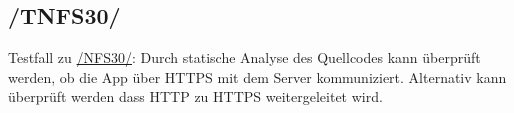 \subsection*{/TNFS30/}
\label{/TNFS30/} Testfall zu \hyperref[/NFS30/]{/NFS30/}: Durch \gls{statische Analyse} des \Gls{Quellcode}s kann überprüft werden, ob die App über \Gls{HTTPS} mit dem \Gls{Server} kommuniziert.
Alternativ kann überprüft werden dass \Gls{HTTP} zu \Gls{HTTPS} weitergeleitet wird.